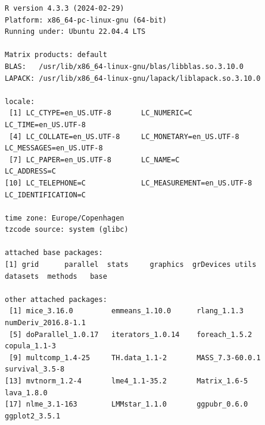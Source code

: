 \documentclass[12pt]{article}
\begin{document}
\begin{verbatim}
R version 4.3.3 (2024-02-29)
Platform: x86_64-pc-linux-gnu (64-bit)
Running under: Ubuntu 22.04.4 LTS

Matrix products: default
BLAS:   /usr/lib/x86_64-linux-gnu/blas/libblas.so.3.10.0 
LAPACK: /usr/lib/x86_64-linux-gnu/lapack/liblapack.so.3.10.0

locale:
 [1] LC_CTYPE=en_US.UTF-8       LC_NUMERIC=C               LC_TIME=en_US.UTF-8       
 [4] LC_COLLATE=en_US.UTF-8     LC_MONETARY=en_US.UTF-8    LC_MESSAGES=en_US.UTF-8   
 [7] LC_PAPER=en_US.UTF-8       LC_NAME=C                  LC_ADDRESS=C              
[10] LC_TELEPHONE=C             LC_MEASUREMENT=en_US.UTF-8 LC_IDENTIFICATION=C       

time zone: Europe/Copenhagen
tzcode source: system (glibc)

attached base packages:
[1] grid      parallel  stats     graphics  grDevices utils     datasets  methods   base     

other attached packages:
 [1] mice_3.16.0         emmeans_1.10.0      rlang_1.1.3         numDeriv_2016.8-1.1
 [5] doParallel_1.0.17   iterators_1.0.14    foreach_1.5.2       copula_1.1-3       
 [9] multcomp_1.4-25     TH.data_1.1-2       MASS_7.3-60.0.1     survival_3.5-8     
[13] mvtnorm_1.2-4       lme4_1.1-35.2       Matrix_1.6-5        lava_1.8.0         
[17] nlme_3.1-163        LMMstar_1.1.0       ggpubr_0.6.0        ggplot2_3.5.1      


\end{verbatim}
\end{document}
